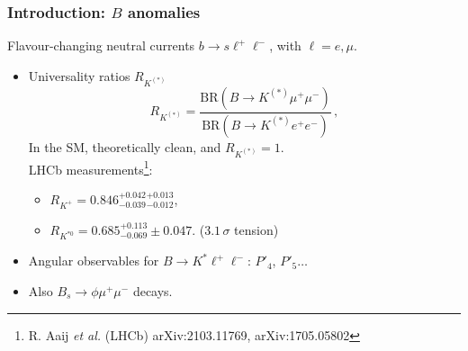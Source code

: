 \documentclass[mathserif, 10pt]{beamer}
\begin{document}
\begin{frame}\frametitle{Introduction: $B$ anomalies}

    Flavour-changing neutral currents $b \to s \ell^+ \ell^-$, with $\ell = e, \mu$.
    \begin{itemize}
        \item Universality ratios $R_{K^{(*)}}$
              $$R_{K^{(*)}} = \frac{\mathrm{BR}(B\to K^{(*)}\mu^+ \mu^-)}{\mathrm{BR}(B\to K^{(*)}e^+ e^-)}\,, $$
              In the SM, theoretically clean, and $R_{K^{(*)}}=1$.\\
              LHCb measurements\footnote{R. Aaij \textit{et al.} (LHCb) arXiv:2103.11769, arXiv:1705.05802}:
              \begin{itemize}
                  \item $R_{K^+} = 0.846^{+0.042}_{-0.039}{}^{+0.013}_{-0.012}$,
                  \item $R_{K^{*0}} = 0.685^{+0.113}_{-0.069}\pm0.047$. ($3.1\,\sigma$ tension)
              \end{itemize}
        \item Angular observables for $B\to K^* \ell^+\ell^-$: $P'_4$, $P'_5\ldots$
        \item Also $B_s \to \phi \mu^+ \mu^-$ decays.
    \end{itemize}

\end{frame}
\end{document}
